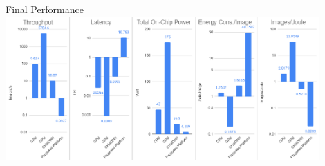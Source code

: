\begin{frame}{Final Performance}
	\centering
	\includegraphics[width=0.9\textwidth]{../Images/Results/Final-Results-charts.png}\\
\end{frame}
